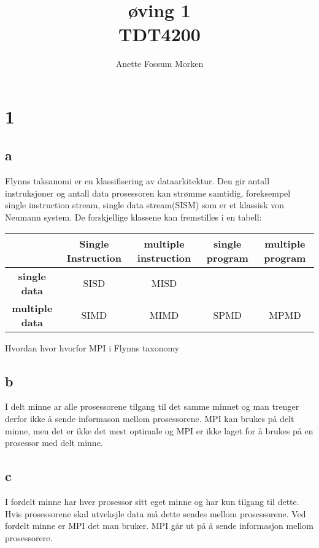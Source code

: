\documentclass[12pt, a4paper]{article} %
\title{øving 1 \\ TDT4200}
\author[1]{Anette Fossum Morken}
\date{}
\begin{document}
\maketitle

\section*{1}
\subsection*{a}
Flynns taksanomi er en klassifisering av dataarkitektur. Den gir antall instruksjoner og antall data prosessoren kan strømme samtidig, foreksempel single instruction stream, single data stream(SISM) som er et klassisk von Neumann system. De forskjellige klassene kan fremstilles i en tabell:

  \begin{tabular}{|@{}c@{}| @{}c@{} |@{}c@{}|@{} c@{} |@{}c@{}| }
    \hline
     & \textbf{Single Instruction} & \textbf{multiple instruction} & \textbf{single program} & \textbf{multiple program} \\ \hline
    \textbf{single data} & SISD & MISD & &  \\ \hline
    \textbf{multiple data} & SIMD & MIMD & SPMD & MPMD \\
    \hline
  \end{tabular}

Hvordan  hvor  hvorfor  MPI i Flynns taxonomy

\subsection*{b}
I delt minne ar alle prosessorene tilgang til det samme minnet og man trenger derfor ikke å sende informason mellom prosessorene. MPI kan brukes på delt minne, men det er ikke det mest optimale og MPI er ikke laget for å brukes på en prosessor med delt minne.

\subsection*{c}
I fordelt minne har hver prosessor sitt eget minne og har kun tilgang til dette. Hvis prosessorene skal utveksjle data må dette sendes mellom prosessorene. Ved fordelt minne er MPI det man bruker. MPI går ut på å sende informasjon mellom prosessorere.
\end{document}
